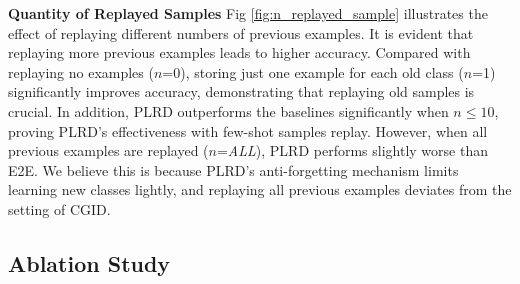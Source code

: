 \documentclass[11pt]{article}
\begin{document}
\textbf{Quantity of Replayed Samples} Fig \ref{fig:n_replayed_sample} illustrates the effect of replaying different numbers of previous examples. It is evident that replaying more previous examples leads to higher accuracy. Compared with replaying no examples ($n$=0), storing just one example for each old class ($n$=1) significantly improves accuracy, demonstrating that replaying old samples is crucial. In addition, PLRD outperforms the baselines significantly when $n\leq10$, proving PLRD's effectiveness with few-shot samples replay. However, when all previous examples are replayed ($n$=\emph{ALL}), PLRD performs slightly worse than E2E. We believe this is because PLRD's anti-forgetting mechanism limits learning new classes lightly, and replaying all previous examples deviates from the setting of CGID.


\subsection{Ablation Study}

\begin{table}[t]
    \centering
{}
\caption{Ablation study of different learning objective for PLRD under Banking OOD ratio = 60\%.}
\label{tab:ablation}
\end{table}
\end{document}
